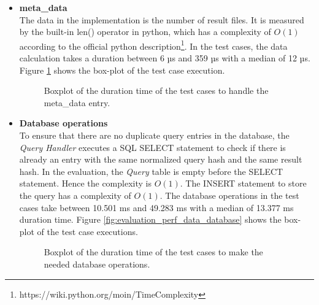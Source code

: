 \documentclass[draft,final]{vutinfth} %
\begin{document}
\begin{itemize}
	\item \textbf{meta\_data} \\
	The data in the implementation is the number of result files. It is measured by the built-in len() operator in python, which has a complexity of $O(1)$ according to the official python description\footnote{https://wiki.python.org/moin/TimeComplexity}. In the test cases, the data calculation takes a duration between 6 µs and 359 µs with a median of 12 µs. Figure \ref{fig:evaluation_perf_meta_data} shows the box-plot of the test case execution.
	\begin{figure}[!h]
		\centering
		\caption{Boxplot of the duration time of the test cases to handle the meta\_data entry.}
		\label{fig:evaluation_perf_meta_data}	
	\end{figure}
	\item \textbf{Database operations} \\
	To ensure that there are no duplicate query entries in the database, the \textit{Query Handler} executes a SQL SELECT statement to check if there is already an entry with the same normalized query hash and the same result hash. In the evaluation, the \textit{Query} table is empty before the SELECT statement. Hence the complexity is $O(1)$. The INSERT statement to store the query has a complexity of $O(1)$. The database operations in the test cases take between 10.501 ms and 49.283 ms with a median of 13.377 ms duration time. Figure \ref{fig:evaluation_perf_data_database} shows the box-plot of the test case executions.  
	\begin{figure}[!h]
		\centering
		\caption{Boxplot of the duration time of the test cases to make the needed database operations.}

\end{figure}
\end{itemize}
\end{document}
